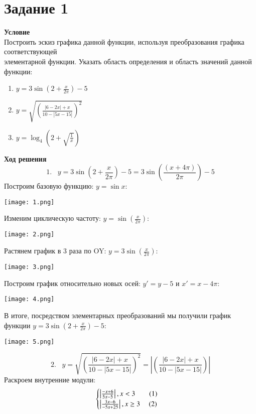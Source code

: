 \newpage
\section{Задание 1}
 {\bf\large Условие} \\Построить эскиз графика данной функции, используя преобразования
графика соответствующей \\ элементарной функции. Указать область определения и область значений данной функции:
\begin{enumerate}
    \item $y =3\sin{\left(2+\frac{x}{2\pi}\right)}-5$
    \item $y =\sqrt{\left(\frac{|6-2x|+x}{10-|5x-15|}\right)^2}$
    \item $y =\log_4{\left(2+\sqrt{\frac{1}{x}}\right)}$
\end{enumerate}
{\bf\large Ход решения} 
\[
    1. \hspace{10pt} y =3\sin{\left(2+\frac{x}{2\pi}\right)}-5 = 3\sin{\left(\frac{(x+4\pi)}{2\pi}\right)}-5
\]
Построим базовую функцию: $y = \sin{x}$: \\
\begin{center}\texttt{[image: 1.png]}\end{center}
Изменим циклическую частоту: $y = \sin{\left(\frac{x}{2\pi}\right)}$: \\
\begin{center}\texttt{[image: 2.png]}\end{center}
Растянем график в 3 раза по OY: $y = 3\sin{\left(\frac{x}{2\pi}\right)}$:
\begin{center}\texttt{[image: 3.png]}\end{center}
Построим график относительно новых осей: 
$y' = y - 5$ и $x' = x - 4\pi$:
\begin{center}\texttt{[image: 4.png]}\end{center}
В итоге, посредством элементарных преобразований мы получили график функции $y =3\sin{\left(2+\frac{x}{2\pi}\right)}-5$:
\begin{center}\texttt{[image: 5.png]}\end{center}
\newpage
\[
    2. \hspace{10pt} y =\sqrt{\left(\frac{|6-2x|+x}{10-|5x-15|}\right)^2} = \left|\left(\frac{|6-2x|+x}{10-|5x-15|}\right)\right|
\]
\noindent Раскроем внутренние модули:
\begin{equation*}
    \begin{cases}
        \left|\frac{-x+6}{5x-5}\right|, x < 3 \hspace{20pt} (1)\\
        \left|\frac{3x-6}{-5x+25}\right|, x \geq 3  \hspace{12.5pt} (2)\\
    \end{cases}
\end{equation*}
